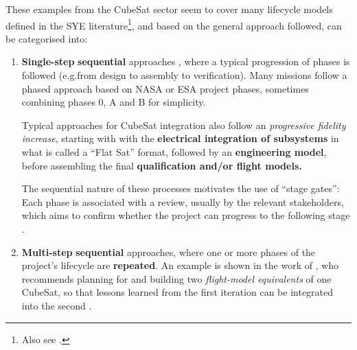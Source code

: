 \documentclass[a4paper,nobib,justified,final]{tufte-book}
\begin{document}
These examples from the CubeSat sector seem to cover many lifecycle models defined in the \acl{SYE} literature\footnote[][0.5cm]{Also see .}, and based on the general approach followed, can be categorised into: %
\begin{enumerate}[itemsep=-1ex]
	\item \textbf{Single-step }\textbf{sequential} approaches \cite{nieto-peroyCubeSatMissionDesign2019,MAIVP,rodigerOSIRIS4CubeSatSystemEngineering2020}, where a typical progression of phases is followed (e.g.\@ from design to assembly to verification). Many missions follow a phased approach based on \acs{NASA} \autocite{sheaNASASystemsEngineering2020} or \acs{ESA} \autocite{ECSS-M-ST-10C} project phases, sometimes combining phases 0, A and B for simplicity.

	Typical approaches for CubeSat integration also follow an \emph{progressive fidelity increase}, starting with with the \textbf{electrical integration of subsystems} in what is called a ``Flat Sat'' format, followed by an \textbf{engineering model}, before assembling the final \textbf{qualification and/or flight models.}

	The sequential nature of these processes motivates the use of ``stage gates'': Each phase is associated with a review, usually by the relevant stakeholders, which aims to confirm whether the project can progress to the following stage \autocite{sousaCubeSatDevelopmentFramework2021}.

	\item \textbf{Multi-step }\textbf{sequential} approaches, where one or more phases of the project's lifecycle are \textbf{repeated}. An example is shown in the work of \citeauthor{deckerSystemsengineeringAssessmentMultiple2016}, who recommends planning for and building two \emph{flight-model equivalents} of one CubeSat, so that lessons learned from the first iteration can be integrated into the second \autocite{deckerSystemsengineeringAssessmentMultiple2016}.
	

\end{enumerate}
\end{document}
